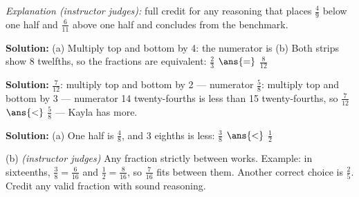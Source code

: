 \documentclass[12pt]{article}
\begin{document}
\emph{Explanation (instructor judges):} full credit for any reasoning that
places $\tfrac{4}{9}$ below one half and $\tfrac{6}{11}$ above one half and
concludes from the benchmark.


\textbf{Solution:} (a) Multiply top and bottom by 4: the numerator is
(b) Both strips show 8 twelfths, so the fractions are equivalent:
$\tfrac{2}{3}$ $\ans{=}$ $\tfrac{8}{12}$


\textbf{Solution:} $\tfrac{7}{12}$: multiply top and bottom by 2 ---
numerator 
$\tfrac{5}{8}$: multiply top and bottom by 3 --- numerator 
14 twenty-fourths is less than 15 twenty-fourths, so
$\tfrac{7}{12}$ $\ans{<}$ $\tfrac{5}{8}$ --- Kayla has more.


\textbf{Solution:} (a) One half is $\tfrac{4}{8}$, and 3 eighths is less:
$\tfrac{3}{8}$ $\ans{<}$ $\tfrac{1}{2}$

(b) \emph{(instructor judges)} Any fraction strictly between works. Example:
in sixteenths, $\tfrac{3}{8} = \tfrac{6}{16}$ and
$\tfrac{1}{2} = \tfrac{8}{16}$, so $\tfrac{7}{16}$ fits between them. Another
correct choice is $\tfrac{2}{5}$. Credit any valid fraction with sound
reasoning.
\end{document}
